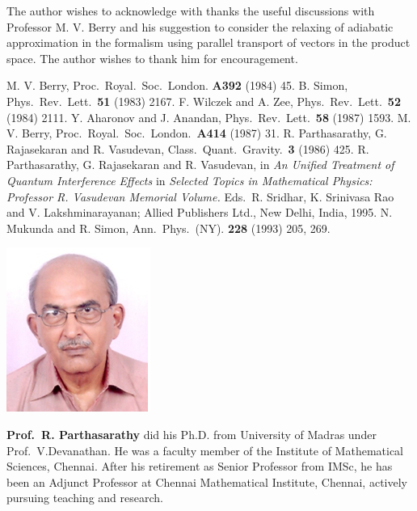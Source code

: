 The author wishes to acknowledge with thanks the useful discussions with Professor M. V. Berry and his suggestion 
to consider the relaxing of adiabatic approximation in the formalism using parallel transport of vectors in the 
product space. The author wishes to thank him for encouragement.  

\begin{thebibliography}{99}
 M. V. Berry, Proc.\ Royal.\ Soc.\ London. {\bf{A392}} (1984) 45.
 B. Simon, Phys.\ Rev.\ Lett.\ {\bf 51} (1983) 2167.
 F. Wilczek and A. Zee, Phys.\ Rev.\ Lett.\ {\bf 52} (1984) 2111.
 Y. Aharonov and J. Anandan, Phys.\ Rev.\ Lett.\ {\bf 58} (1987) 1593.
 M. V. Berry, Proc.\ Royal.\ Soc.\ London.\ {\bf A414} (1987) 31.  
 R. Parthasarathy, G. Rajasekaran and R. Vasudevan, Class.\ Quant.\ Gravity.\ {\bf 3} (1986) 425.
 R. Parthasarathy, G. Rajasekaran and R. Vasudevan, in {\textit{An Unified Treatment of Quantum Interference Effects}} in \textit{Selected Topics in Mathematical Physics: Professor R. Vasudevan Memorial Volume.} Eds.\ R. Sridhar, K. Srinivasa Rao and V. Lakshminarayanan; Allied Publishers Ltd., New Delhi, India, 1995.
 N. Mukunda and R. Simon, Ann.\ Phys.\ (NY). {\bf 228} (1993) 205, 269.
\end{thebibliography}
\newpage

\centerline{\includegraphics[scale=1.8]{authorsphotos/Prof_R_Parthasarathy.eps}}
\smallskip

\bigskip

\noindent\textbf{Prof.\ R. Parthasarathy} did his Ph.D. from University of Madras under Prof.\ V.Devanathan. He was a faculty member of the Institute of Mathematical Sciences, Chennai. After his retirement as Senior Professor from IMSc, he has been an Adjunct Professor at Chennai Mathematical Institute, Chennai, actively pursuing teaching and research.



